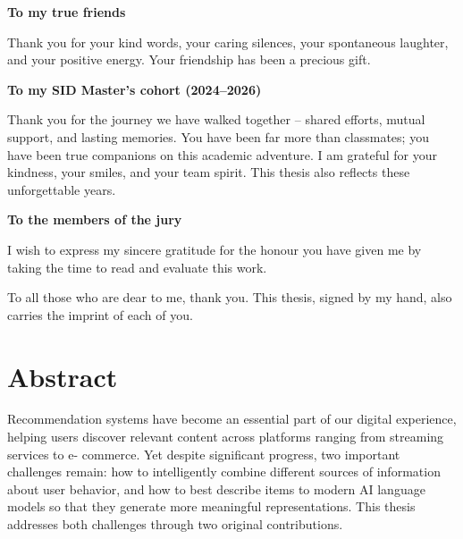 \documentclass[12pt,a4paper]{report}
\begin{document}
\vspace{0.5cm}

\noindent\textbf{\large To my true friends}

Thank you for your kind words, your caring silences, your spontaneous laughter,
and your positive energy. Your friendship has been a precious gift.

\vspace{0.5cm}

\noindent\textbf{\large To my SID Master's cohort (2024--2026)}

Thank you for the journey we have walked together -- shared efforts, mutual
support, and lasting memories. You have been far more than classmates; you have
been true companions on this academic adventure. I am grateful for your
kindness, your smiles, and your team spirit. This thesis also reflects these
unforgettable years.

\vspace{0.5cm}

\noindent\textbf{\large To the members of the jury}

I wish to express my sincere gratitude for the honour you have given me by
taking the time to read and evaluate this work.

\vspace{1cm}

\begin{center}
To all those who are dear to me, thank you. This thesis, signed by my hand,
also carries the imprint of each of you.
\end{center}


\newpage
\section*{Abstract}
\vspace{0.5cm}

Recommendation systems have become an essential part of our digital experience, helping
users discover relevant content across platforms ranging from streaming services to e-
commerce. Yet despite significant progress, two important challenges remain: how to
intelligently combine different sources of information about user behavior, and how to best
describe items to modern AI language models so that they generate more meaningful
representations. This thesis addresses both challenges through two original contributions.
\end{document}

